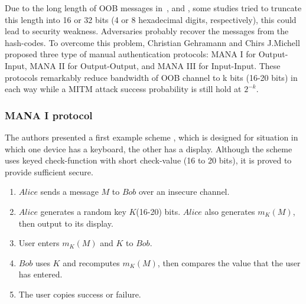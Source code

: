 Due to the long length of OOB messages in~\cite{1624021}, and \cite{Smetters02talkingto}, some studies tried to truncate this length into 16 or 32 bits (4 or 8 hexadecimal digits, respectively), this could lead to security weakness. Adversaries probably recover the messages from the hash-codes. To overcome this problem, Christian Gehramann and Chirs J.Michell \cite{Mitchell:2004p25948} proposed three type of manual authentication protocols: MANA I for Output-Input, MANA II for Output-Output, and MANA III for Input-Input. These protocols remarkably reduce bandwidth of OOB channel to k bits (16-20 bits) in each way while a MITM attack success probability is still hold at $2^{-k}$. 

\subsubsection*{MANA I protocol}

The authors presented a first example scheme \cite{Mitchell:2004p25948}, which is designed for situation in which one device has a keyboard, the other has a display. Although the scheme uses keyed check-function with short check-value (16 to 20 bits), it is proved to provide sufficient secure. 

\begin{enumerate}
\item $Alice$ sends a message $M$ to $Bob$ over an insecure channel. 
\item $Alice$ generates a random key $K$(16-20) bits. $Alice$ also generates $m_K(M)$, then output to its display.
\item User enters $m_K(M)$ and $K$ to $Bob$.
\item $Bob$ uses $K$ and recomputes $m_K(M)$, then compares the value that the user has entered.
\item The user copies success or failure. 
\end{enumerate}

\begin{center}
\end{center}

